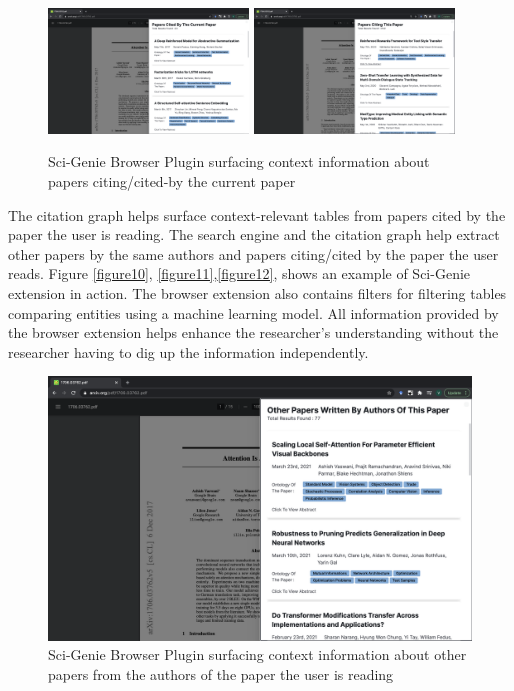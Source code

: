 \begin{figure}[h]
    \includegraphics[width=0.475\textwidth]{src/images/sci-genie-ext-cite-out-exp.png}
    \hfill
    \includegraphics[width=0.475\textwidth]{src/images/sci-genie-ext-cite-exp.png}
    \caption{ Sci-Genie Browser Plugin surfacing context information about papers citing/cited-by the current paper }
    \label{figure\arabic{figurecounter}}
\end{figure}

The citation graph helps surface context-relevant tables from papers cited by the paper the user is reading.  The search engine and the citation graph help extract other papers by the same authors and papers citing/cited by the paper the user reads. Figure \ref{figure10}, \ref{figure11},\ref{figure12}, shows an example of Sci-Genie extension in action. The browser extension also contains filters for filtering tables comparing entities using a machine learning model. All information provided by the browser extension helps enhance the researcher’s understanding without the researcher having to dig up the information independently. 

\begin{figure}[h]
    \centering
    \includegraphics[width=\maxwidth{\textwidth}]{src/images/sci-genie-ext-authors-exp.png}
    \caption{ Sci-Genie Browser Plugin surfacing context information about other papers from the authors of the paper the user is reading}
    \label{figure\arabic{figurecounter}}
\end{figure}

